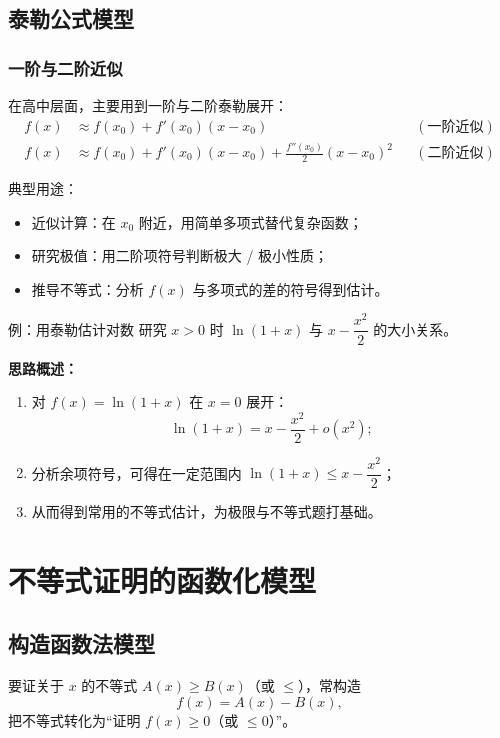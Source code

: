 \documentclass[a4paper,11pt]{ctexart}
\begin{document}
\subsection{泰勒公式模型}

\subsubsection{一阶与二阶近似}

在高中层面，主要用到一阶与二阶泰勒展开：
\begin{align*}
  f(x)&\approx f(x_0)+f'(x_0)(x-x_0) &&(\text{一阶近似})\\
  f(x)&\approx f(x_0)+f'(x_0)(x-x_0)+\frac{f''(x_0)}{2}(x-x_0)^2 &&(\text{二阶近似})
\end{align*}

典型用途：
\begin{itemize}
  \item 近似计算：在 $x_0$ 附近，用简单多项式替代复杂函数；
  \item 研究极值：用二阶项符号判断极大 / 极小性质；
  \item 推导不等式：分析 $f(x)$ 与多项式的差的符号得到估计。
\end{itemize}

\begin{examplebox}[mathnote coverage=soft]{例：用泰勒估计对数}
  研究 $x>0$ 时 $\ln(1+x)$ 与 $x-\dfrac{x^2}{2}$ 的大小关系。
\end{examplebox}

\textbf{思路概述：}
\begin{enumerate}
  \item 对 $f(x)=\ln(1+x)$ 在 $x=0$ 展开：
  \[
    \ln(1+x)=x-\frac{x^2}{2}+o(x^2);
  \]
  \item 分析余项符号，可得在一定范围内 $\ln(1+x)\le x-\dfrac{x^2}{2}$；
  \item 从而得到常用的不等式估计，为极限与不等式题打基础。
\end{enumerate}

\section{不等式证明的函数化模型}

\subsection{构造函数法模型}

要证关于 $x$ 的不等式 $A(x)\ge B(x)$（或 $\le$），常构造
\[
  f(x)=A(x)-B(x),
\]
把不等式转化为“证明 $f(x)\ge 0$（或 $\le 0$）”。
\end{document}
